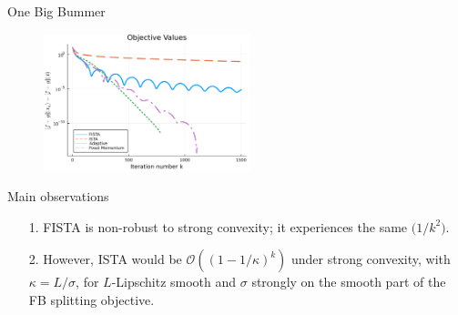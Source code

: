 \documentclass[11pt]{beamer}
\theoremstyle{definition}
\begin{document}
    \begin{frame}{One Big Bummer}
        \begin{figure}
            \includegraphics[width=6cm]{Assets/obj_vals.png}
        \end{figure}
        Main observations
        \begin{itemize}
            \item [1.] FISTA is non-robust to strong convexity; it experiences the same $\mathcal (1/k^2)$. 
            \item [2.] However, ISTA would be $\mathcal O((1 - 1/\kappa)^k)$ under strong convexity, with $\kappa = L/\sigma$, for $L$-Lipschitz smooth and $\sigma$ strongly on the smooth part of the FB splitting objective. 
        \end{itemize}
    \end{frame}
        
    
\end{document}
